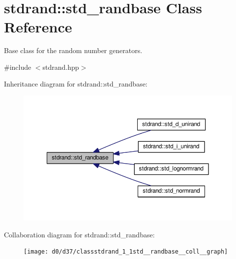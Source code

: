 \hypertarget{classstdrand_1_1std__randbase}{}\section{stdrand\+:\+:std\+\_\+randbase Class Reference}
\label{classstdrand_1_1std__randbase}


Base class for the random number generators.  




{\ttfamily \#include $<$stdrand.\+hpp$>$}



Inheritance diagram for stdrand\+:\+:std\+\_\+randbase\+:\nopagebreak
\begin{figure}[H]
\begin{center}
\leavevmode
\includegraphics[width=350pt]{d1/d27/classstdrand_1_1std__randbase__inherit__graph}
\end{center}
\end{figure}


Collaboration diagram for stdrand\+:\+:std\+\_\+randbase\+:
\nopagebreak
\begin{figure}[H]
\begin{center}
\leavevmode
\texttt{[image: d0/d37/classstdrand\_1\_1std\_\_randbase\_\_coll\_\_graph]}
\end{center}
\end{figure}
